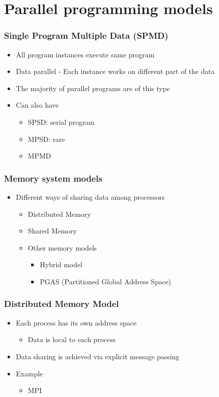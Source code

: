 \documentclass[10pt,t]{beamer}
\begin{document}
\section{Parallel programming models}
\begin{frame}
\frametitle{Single Program Multiple Data (SPMD)}
\begin{itemize}
\item All program instances execute same program
\item Data parallel - Each instance works on different part of the data
\item The majority of parallel programs are of this type
\item Can also have
\begin{itemize}
\item SPSD: serial program
\item MPSD: rare
\item MPMD 
\end{itemize}
\end{itemize}
\end{frame}

\begin{frame}
\frametitle{Memory system models}
\begin{itemize}
\item Different ways of sharing data among processors
\begin{itemize}
\item Distributed Memory
\item Shared Memory
\item Other memory models
\begin{itemize}
\item Hybrid model
\item PGAS (Partitioned Global Address Space) 
\end{itemize}
\end{itemize}
\end{itemize}
\end{frame}

\begin{frame}
  \frametitle{Distributed Memory Model}
    \begin{itemize}
      \item Each process has its own address space
      \begin{itemize}
        \item Data is local to each process
      \end{itemize}
      \item Data sharing is achieved via explicit message passing
      \item Example
      \begin{itemize}
        \item MPI
      \end{itemize}
    \end{itemize}
    
\end{frame}
\end{document}
